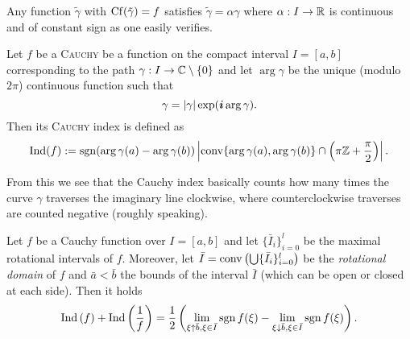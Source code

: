 \documentclass[10pt,a4paper]{article}
\begin{document}
\begin{remark}
Any function $\tilde{\gamma}$ with $\operatorname{Cf}(\tilde{\gamma})=f$ satisfies $\tilde{\gamma}=\alpha\gamma$ where $\alpha:I\rightarrow\mathbb{R}$ is continuous and of constant sign as one easily verifies. 
\end{remark}

\begin{definition} Let $f$ be a \textsc{Cauchy} be a function on the compact interval $I=[a,b]$ corresponding to the path $\gamma:I\rightarrow\mathbb{C}\setminus\{0\}$ and let $\arg{\gamma}$ be the unique (modulo $2\pi$) continuous function such that 
\begin{equation}
\gamma = \left|\gamma\right|\exp(\boldsymbol{i}\arg{\gamma})\text{.}
\end{equation}
Then its \textsc{Cauchy} index is defined as
\begin{equation}
\operatorname{Ind}(f):=\operatorname{sgn}(\arg{\gamma(a)}-\arg{\gamma(b)})\left|\operatorname{conv}\{\arg{\gamma(a)},\arg{\gamma(b)}\}\cap\left(\pi\mathbb{Z}+\frac{\pi}{2}\right)\right|\text{.}
\end{equation}
\end{definition}

\begin{remark} From this we see that the Cauchy index basically counts how many times the curve $\gamma$ traverses the imaginary line clockwise, where counterclockwise traverses are counted negative (roughly speaking). 
\end{remark} %

\begin{lemma} Let $f$ be a Cauchy function over $I=[a,b]$ and let $\{\bar{I}_i\}_{i=0}^l$ be the maximal rotational intervals of $f$. Moreover, let $\bar{I}=\operatorname{conv}\left(\bigcup\{\bar{I}_i\}_{i=0}^l\right)$ be the \emph{rotational domain} of $f$ and $\bar{a}<\bar{b}$ the bounds of the interval $\bar{I}$ (which can be open or closed at each side).  
Then it holds
\begin{equation}
\operatorname{Ind}\left(f\right)+\operatorname{Ind}\left(\frac{1}{f}\right)=\frac{1}{2}\left(\lim_{\xi\uparrow\bar{b},\xi\in\bar{I}}{\operatorname{sgn}{f(\xi)}}-\lim_{\xi\downarrow\bar{b},\xi\in\bar{I}}{\operatorname{sgn}{f(\xi)}}\right)\text{.}
\end{equation}
\end{lemma}
\end{document}
